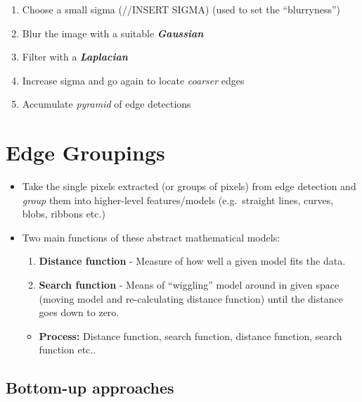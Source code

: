 \documentclass[english, 10pt]{article}
\begin{document}
\begin{itemize}
  \begin{enumerate}
  \def\labelenumi{\arabic{enumi}.}
  \itemsep1pt\parskip0pt
  \item
    Choose a small sigma (//INSERT SIGMA) (used to set the
    ``blurryness'')
  \item
    Blur the image with a suitable \textbf{\emph{Gaussian}}
  \item
    Filter with a \textbf{\emph{Laplacian}}
  \item
    Increase sigma and go again to locate \emph{coarser} edges
  \item
    Accumulate \emph{pyramid} of edge detections
  \end{enumerate}
\end{itemize}

\section{Edge Groupings}\label{edge-groupings}

\begin{itemize}
\item
  Take the single pixels extracted (or groups of pixels) from edge
  detection and \emph{group} them into higher-level features/models
  (e.g.~straight lines, curves, blobs, ribbons etc.)
\item
  Two main functions of these abstract mathematical models:

  \begin{enumerate}
  \def\labelenumi{\arabic{enumi}.}
  \item
    \textbf{Distance function} - Measure of how well a given model fits
    the data.
  \item
    \textbf{Search function} - Means of ``wiggling'' model around in
    given space (moving model and re-calculating distance function)
    until the distance goes down to zero.
  \end{enumerate}

  \begin{itemize}
  \itemsep1pt\parskip0pt
  \item
    \textbf{Process:} Distance function, search function, distance
    function, search function etc..
  \end{itemize}
\end{itemize}

\subsection{Bottom-up approaches}\label{bottom-up-approaches}
\end{document}
